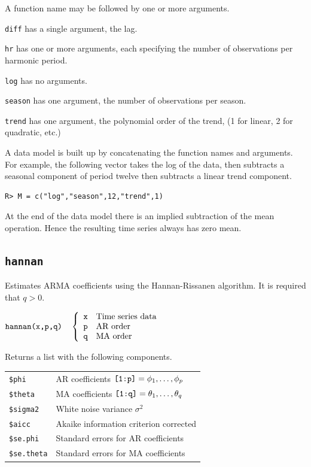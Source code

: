 \documentclass[11pt]{article}
\begin{document}
\noindent
A function name may be followed by one or more arguments.

\medskip
\noindent
{\tt diff} has a single argument, the lag.

\medskip
\noindent
{\tt hr} has one or more arguments, each specifying the number
of observations per harmonic period.

\medskip
\noindent
{\tt log} has no arguments.

\medskip
\noindent
{\tt season} has one argument, the number of observations per season.

\medskip
\noindent
{\tt trend} has one argument, the polynomial order of the trend,
(1 for linear, 2 for quadratic, etc.)

\bigskip
\noindent
A data model is built up by concatenating the function
names and arguments. For example, the following vector takes the
log of the data, then subtracts a seasonal component of period twelve
then subtracts a linear trend component.

\begin{verbatim}
R> M = c("log","season",12,"trend",1)
\end{verbatim}

\noindent
At the end of the data model there is an implied subtraction
of the mean operation.
Hence the resulting time series always has zero mean.

\newpage

\subsection{\tt hannan}
Estimates ARMA coefficients using the Hannan-Rissanen algorithm.
It is required that $q>0$.

\bigskip
$
\hbox{\tt hannan(x,p,q)}\quad\left\{\begin{array}{ll}
{\tt x} & \hbox{Time series data}\\
{\tt p} & \hbox{AR order}\\
{\tt q} & \hbox{MA order}
\end{array}\right.
$

\bigskip
\noindent
Returns a list with the following components.

\begin{center}
\begin{tabular}{ll}
{\tt \$phi} & AR coefficients $\hbox{\tt[1:p]}=\phi_1,\ldots,\phi_p$\\
{\tt \$theta} & MA coefficients $\hbox{\tt[1:q]}=\theta_1,\ldots,\theta_q$\\
{\tt \$sigma2} & White noise variance $\sigma^2$\\
{\tt \$aicc} & Akaike information criterion corrected\\
{\tt \$se.phi} & Standard errors for AR coefficients\\
{\tt \$se.theta} & Standard errors for MA coefficients
\end{tabular}
\end{center}
\end{document}

